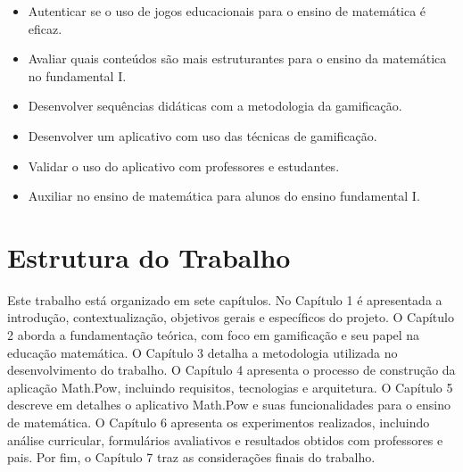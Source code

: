 \begin{itemize}
\item{Autenticar se o uso de jogos educacionais para o ensino de matemática é eficaz.
}
\item {Avaliar quais conteúdos são mais estruturantes para o ensino da matemática no fundamental I.
} 
\item {Desenvolver sequências didáticas com a metodologia da gamificação.
 }  
\item {Desenvolver um aplicativo com uso das técnicas de gamificação.
}
\item {Validar o uso do aplicativo com professores e estudantes.
}
\item {Auxiliar no ensino de matemática para alunos do ensino fundamental I.
}
\end{itemize}

\section{Estrutura do Trabalho}

Este trabalho está organizado em sete capítulos. No Capítulo 1 é apresentada a introdução, contextualização, objetivos gerais e específicos do projeto. O Capítulo 2 aborda a fundamentação teórica, com foco em gamificação e seu papel na educação matemática. O Capítulo 3 detalha a metodologia utilizada no desenvolvimento do trabalho. O Capítulo 4 apresenta o processo de construção da aplicação Math.Pow, incluindo requisitos, tecnologias e arquitetura. O Capítulo 5 descreve em detalhes o aplicativo Math.Pow e suas funcionalidades para o ensino de matemática. O Capítulo 6 apresenta os experimentos realizados, incluindo análise curricular, formulários avaliativos e resultados obtidos com professores e pais. Por fim, o Capítulo 7 traz as considerações finais do trabalho.


